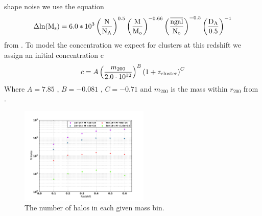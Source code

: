 shape noise we use the equation
\begin{equation}
\Delta \rm{ln} (M_{s}) = 6.0*10^3
\left( \frac{N}{N_{A}} \right)^{0.5} \left( \frac{M}{M_{o}} \right)^{-0.66} \left( \frac{\overline{ngal}}{N_{o}} \right)^{-0.5}\left( \frac{D_{A}}{0.5} \right)^{-1}
\end{equation}
from \citep{obscos} . To model the concentration we expect
for clusters at this redshift we assign an initial concentration c
\begin{equation}
c= A \left(  m_{200} \over 2.0 \cdot 10^{12}  \right)^{B} \left( 1 + z_{\rm{cluster}} \right)^{C}
\end{equation}
Where  $ A = 7.85 $ ,  $ B = -0.081 $ , $ C= -0.71 $ and $m_{200}$ is
the mass within $r_{200}$ from \citep{oguri}.

\begin{figure}
 \centering  %
  \includegraphics[width=0.55\textwidth]{fig/Halo_N.pdf} 
  \caption{The number of halos in each given mass bin.}
\label{fig:N_Halo}
\end{figure} 
